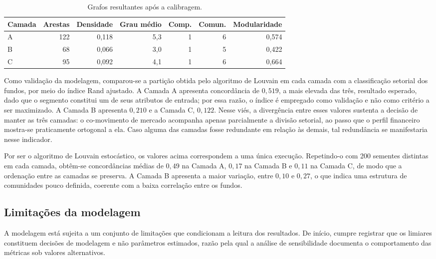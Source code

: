 \begin{table}[htbp]
\centering
\caption{Grafos resultantes após a calibragem.}
\label{tab:camadas}
\begin{tabular}{lrrrrrr}
\toprule
\textbf{Camada} & \textbf{Arestas} & \textbf{Densidade} & \textbf{Grau médio}
& \textbf{Comp.} & \textbf{Comun.} & \textbf{Modularidade} \\
\midrule
A & 122 & 0,118 & 5,3 & 1 & 6 & 0,574 \\
B & 68 & 0,066 & 3,0 & 1 & 5 & 0,422 \\
C & 95 & 0,092 & 4,1 & 1 & 6 & 0,664 \\
\bottomrule
\end{tabular}
\end{table}

Como validação da modelagem, comparou-se a partição obtida pelo algoritmo de
Louvain em cada camada com a classificação setorial dos fundos, por meio do
índice Rand ajustado. A Camada A apresenta concordância de $0{,}519$, a mais
elevada das três, resultado esperado, dado que o segmento constitui um de seus
atributos de entrada; por essa razão, o índice é empregado como validação e
não como critério a ser maximizado. A Camada B apresenta
$0{,}210$ e a Camada C, $0{,}122$. Nesse viés, a divergência entre esses
valores sustenta a decisão de manter as três camadas: o co-movimento de
mercado acompanha apenas parcialmente a divisão setorial, ao passo que o
perfil financeiro mostra-se praticamente ortogonal a ela. Caso alguma das
camadas fosse redundante em relação às demais, tal redundância se manifestaria
nesse indicador.

Por ser o algoritmo de Louvain estocástico, os valores acima correspondem a
uma única execução. Repetindo-o com 200 sementes distintas em cada camada,
obtêm-se concordâncias médias de $0{,}49$ na Camada A, $0{,}17$ na Camada B e
$0{,}11$ na Camada C, de modo que a ordenação entre as camadas se preserva. A
Camada B apresenta a maior variação, entre $0{,}10$ e $0{,}27$, o que indica
uma estrutura de comunidades pouco definida, coerente com a baixa correlação
entre os fundos.

\subsection{Limitações da modelagem}

A modelagem está sujeita a um conjunto de limitações que condicionam a leitura
dos resultados. De início, cumpre registrar que os limiares constituem
decisões de modelagem e não parâmetros estimados, razão pela qual a análise de
sensibilidade documenta o comportamento das métricas sob valores alternativos.

